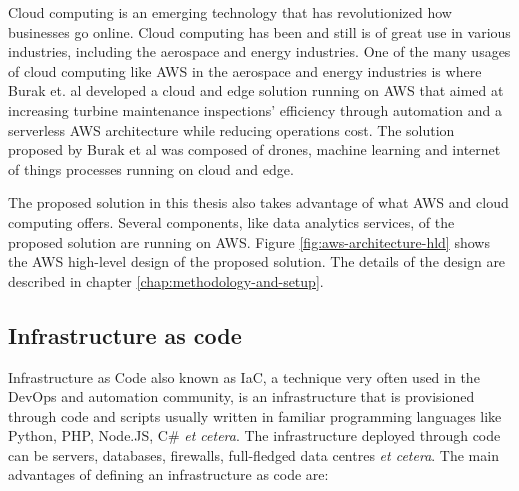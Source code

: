 Cloud computing is an emerging technology that has revolutionized how businesses go online. Cloud computing has been and still is of great use in various industries, including the aerospace and energy industries. One of the many usages of cloud computing like AWS in the aerospace and energy industries is where Burak et. al developed a cloud and edge solution running on AWS that aimed at increasing turbine maintenance inspections' efficiency through automation and a serverless AWS architecture while reducing operations cost\cite{burakawswindfarm2021}. The solution proposed by Burak et al was composed of drones, machine learning and internet of things processes running on cloud and edge.

The proposed solution in this thesis also takes advantage of what AWS and cloud computing offers. Several components, like data analytics services, of the proposed solution are running on AWS. Figure \ref{fig:aws-architecture-hld} shows the AWS high-level design of the proposed solution. The details of the design are described in chapter \ref{chap:methodology-and-setup}.




\subsection{Infrastructure as code}
\label{subsec:iac}

Infrastructure as Code also known as IaC, a technique very often used in the DevOps and automation community, is an infrastructure that is provisioned through code and scripts usually written in familiar programming languages like Python, PHP, Node.JS, C\# \textit{et cetera}. The infrastructure deployed through code can be servers, databases, firewalls, full-fledged data centres \textit{et cetera}. The main advantages of defining an infrastructure as code are:

